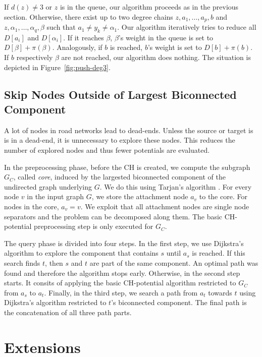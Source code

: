 \documentclass[sigconf]{acmart}
\begin{document}
If $d(z)\neq 3$ or $z$ is in the queue, our algorithm proceeds as in the previous section.
Otherwise, there exist up to two degree chains $z,a_1,\ldots,a_p,b$ and $z,\alpha_1,\ldots,\alpha_q,\beta$ such that $a_1\neq y_k \neq \alpha_1$.
Our algorithm iteratively tries to reduce all $D[a_i]$ and $D[\alpha_i]$.
If it reaches $\beta$, $\beta$'s weight in the queue is set to $D[\beta]+\pi(\beta)$.
Analogously, if $b$ is reached, $b$'s weight is set to $D[b]+\pi(b)$.
If $b$ respectively $\beta$ are not reached, our algorithm does nothing.
The situation is depicted in Figure~\ref{fig:push-deg3}.

\subsection{Skip Nodes Outside of Largest Biconnected Component}

\label{sec:largested-biconnected-component}

A lot of nodes in road networks lead to dead-ends.
Unless the source or target is is in a dead-end, it is unnecessary to explore these nodes.
This reduces the number of explored nodes and thus fewer potentials are evaluated.

In the preprocessing phase, before the CH is created, we compute the subgraph $G_C$, called \emph{core}, induced by the largested biconnected component of the undirected graph underlying $G$.
We do this using Tarjan's algorithm \cite{t-dfslg2-72}.
For every node $v$ in the input graph $G$, we store the attachment node $a_v$ to the core.
For nodes in the core, $a_v=v$.
We exploit that all attachment nodes are single node separators and the problem can be decomposed along them.
The basic CH-potential preprocessing step is only executed for $G_C$.

The query phase is divided into four steps.
In the first step, we use Dijkstra's algorithm to explore the component that contains $s$ until $a_s$ is reached.
If this search finds $t$, then $s$ and $t$ are part of the same component.
An optimal path was found and therefore the algorithm stops early.
Otherwise, in the second step starts.
It consits of applying the basic CH-potential algorithm restricted to $G_C$ from $a_s$ to $a_t$.
Finally, in the third step, we search a path from $a_t$ towards $t$ using Dijkstra's algorithm restricted to $t$'s biconnected component.
The final path is the concatenation of all three path parts.

\section{Extensions}
\end{document}
